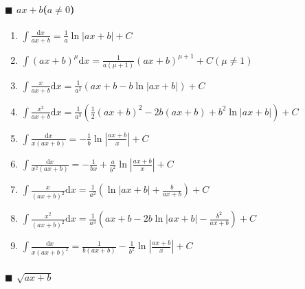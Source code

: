 ﻿\newcommand{\md}{\mathrm{d}}
\newcommand{\me}{\mathrm{e}}

\paragraph{$\blacksquare$ $ax+b$($a \neq 0$)}

\begin{enumerate}

\item $ \int \frac{\md x}{ax+b} = \frac{1}{a} \ln |ax+b| + C $

\item $ \int (ax+b)^{\mu} \md x = \frac{1}{a(\mu+1)}(ax+b)^{\mu+1} + C (\mu \neq 1) $

\item $ \int \frac{x}{ax+b} \md x = \frac{1}{a^2} (ax+b-b\ln|ax+b|) + C $

\item $ \int \frac{x^2}{ax+b} \md x = \frac{1}{a^3} \left( \frac{1}{2}(ax+b)^2-2b(ax+b)+b^2\ln|ax+b| \right) + C $

\item $ \int \frac{\md x}{x(ax+b)} = -\frac{1}{b}\ln \left| \frac{ax+b}{x} \right| + C $

\item $ \int \frac{\md x}{x^2(ax+b)} = -\frac{1}{bx} + \frac{a}{b^2}\ln\left| \frac{ax+b}{x} \right| + C $

\item $ \int \frac{x}{(ax+b)^2} \md x = \frac{1}{a^2}\left( \ln|ax+b|+\frac{b}{ax+b} \right) + C $

\item $ \int \frac{x^2}{(ax+b)^2}\md x = \frac{1}{a^3} \left( ax+b-2b\ln|ax+b|-\frac{b^2}{ax+b} \right) + C $

\item $ \int \frac{\md x}{x(ax+b)^2} = \frac{1}{b(ax+b)} - \frac{1}{b^2}\ln\left| \frac{ax+b}{x} \right| + C $

\end{enumerate}

\paragraph{$\blacksquare$ $\sqrt{ax+b}$}

